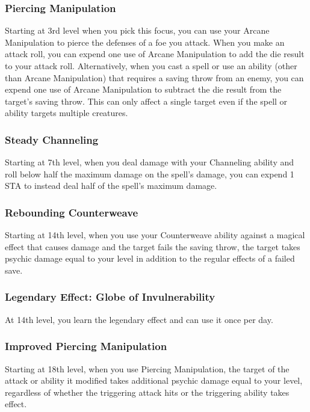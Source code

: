 \subsubsection{Piercing Manipulation}
Starting at 3rd level when you pick this focus, you can use your Arcane Manipulation to pierce the defenses of a foe you attack. When you make an attack roll, you can expend one use of Arcane Manipulation to add the die result to your attack roll. Alternatively, when you cast a spell or use an ability (other than Arcane Manipulation) that requires a saving throw from an enemy, you can expend one use of Arcane Manipulation to subtract the die result from the target's saving throw. This can only affect a single target even if the spell or ability targets multiple creatures.

\subsubsection{Steady Channeling}
Starting at 7th level, when you deal damage with your Channeling ability and roll below half the maximum damage on the spell's damage, you can expend 1 STA to instead deal half of the spell's maximum damage.

\subsubsection{Rebounding Counterweave}
Starting at 14th level, when you use your Counterweave ability against a magical effect that causes damage and the target fails the saving throw, the target takes psychic damage equal to your level in addition to the regular effects of a failed save.

\subsubsection{Legendary Effect: Globe of Invulnerability}
At 14th level, you learn the legendary effect  and can use it once per day.

\subsubsection{Improved Piercing Manipulation}
Starting at 18th level, when you use Piercing Manipulation, the target of the attack or ability it modified takes additional psychic damage equal to your level, regardless of whether the triggering attack hits or the triggering ability takes effect.

